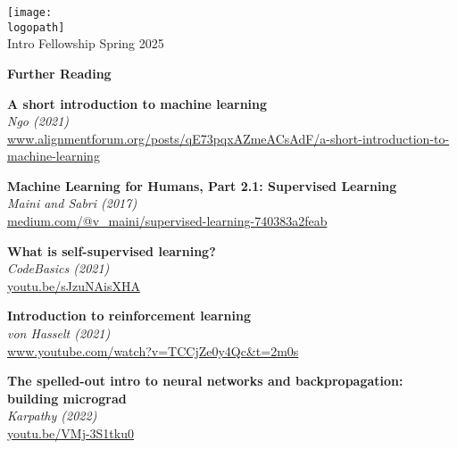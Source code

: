 \documentclass[12pt]{article}
\def\logopath{../assets/caiac_logo.png}  %
\def\programlongname{
    Intro Fellowship
}
\def\timeperiod{
    Spring 2025
}
\begin{document}
\thispagestyle{empty} %

\begin{center}
    \texttt{[image: \\logopath]}\\
    \vspace{0.2em}
    {\color{primaryFaded}\programlongname\color{primaryFaded}\timeperiod}
\end{center}

\vspace{1em}

\begin{center}
    {\LARGE \textbf{Further Reading}}
\end{center}

\vspace{1em}

% 
\noindent\textbf{ A short introduction to machine learning }\\
\textit{ Ngo (2021) }\\
{\small \url{ www.alignmentforum.org/posts/qE73pqxAZmeACsAdF/a-short-introduction-to-machine-learning }}

\vspace{1em}
% 
\noindent\textbf{ Machine Learning for Humans, Part 2.1: Supervised Learning }\\
\textit{ Maini and Sabri (2017) }\\
{\small \url{ medium.com/@v_maini/supervised-learning-740383a2feab }}

\vspace{1em}
% 
\noindent\textbf{ What is self-supervised learning? }\\
\textit{ CodeBasics (2021) }\\
{\small \url{ youtu.be/sJzuNAisXHA }}

\vspace{1em}
% 
\noindent\textbf{ Introduction to reinforcement learning }\\
\textit{ von Hasselt (2021) }\\
{\small \url{ www.youtube.com/watch?v=TCCjZe0y4Qc&t=2m0s }}

\vspace{1em}
% 
\noindent\textbf{ The spelled-out intro to neural networks and backpropagation: building micrograd }\\
\textit{ Karpathy (2022) }\\
{\small \url{ youtu.be/VMj-3S1tku0 }}
\end{document}
